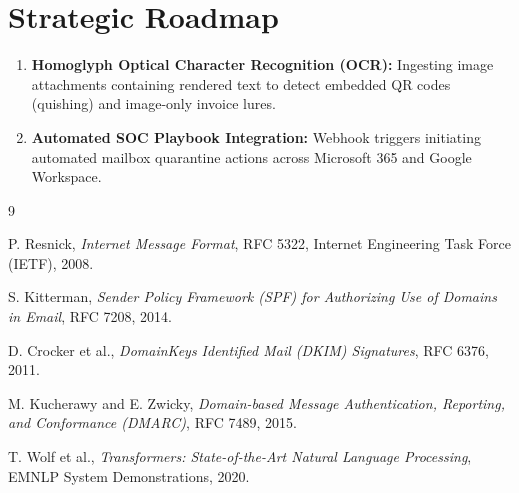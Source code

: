 \documentclass[12pt,a4paper]{report}
\begin{document}
\section{Strategic Roadmap}
\begin{enumerate}[nosep]
    \item \textbf{Homoglyph Optical Character Recognition (OCR):} Ingesting image attachments containing rendered text to detect embedded QR codes (quishing) and image-only invoice lures.
    \item \textbf{Automated SOC Playbook Integration:} Webhook triggers initiating automated mailbox quarantine actions across Microsoft 365 and Google Workspace.
\end{enumerate}

\cleardoublepage
\begin{thebibliography}{9}

P. Resnick, \textit{Internet Message Format}, RFC 5322, Internet Engineering Task Force (IETF), 2008.

S. Kitterman, \textit{Sender Policy Framework (SPF) for Authorizing Use of Domains in Email}, RFC 7208, 2014.

D. Crocker et al., \textit{DomainKeys Identified Mail (DKIM) Signatures}, RFC 6376, 2011.

M. Kucherawy and E. Zwicky, \textit{Domain-based Message Authentication, Reporting, and Conformance (DMARC)}, RFC 7489, 2015.

T. Wolf et al., \textit{Transformers: State-of-the-Art Natural Language Processing}, EMNLP System Demonstrations, 2020.

\end{thebibliography}
\end{document}
